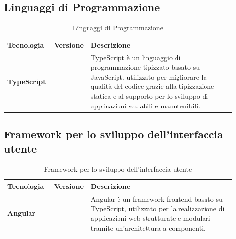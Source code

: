 \documentclass[a4paper,12pt]{article}
\begin{document}
{        \subsection{Linguaggi di Programmazione}
        \begin{table}[H]
            \captionsetup{skip=10pt}
            \caption{Linguaggi di Programmazione}
            \begin{tabular}{|>{\centering\arraybackslash}m{0.20\linewidth}|>{\centering\arraybackslash}m{0.10\linewidth}|>{\centering\arraybackslash}m{0.62\linewidth}|}
                \hline
                \textbf{Tecnologia} & \textbf{Versione} & \textbf{Descrizione} \\
                \hline
                \textbf{TypeScript} &  & TypeScript è un linguaggio di programmazione tipizzato basato su JavaScript, utilizzato per migliorare la qualità del codice grazie alla tipizzazione statica e al supporto per lo sviluppo di applicazioni scalabili e manutenibili. \\
                \hline
            \end{tabular}
        \end{table}

        \subsection{Framework per lo sviluppo dell'interfaccia utente}
        \begin{table}[H]
            \captionsetup{skip=10pt}
            \caption{Framework per lo sviluppo dell'interfaccia utente}
            \begin{tabular}{|>{\centering\arraybackslash}m{0.20\linewidth}|>{\centering\arraybackslash}m{0.10\linewidth}|>{\centering\arraybackslash}m{0.62\linewidth}|}
                \hline
                \textbf{Tecnologia} & \textbf{Versione} & \textbf{Descrizione} \\
                \hline
                \textbf{Angular} &  & Angular è un framework frontend basato su TypeScript, utilizzato per la realizzazione di applicazioni web strutturate e modulari tramite un’architettura a componenti. \\
                \hline
            \end{tabular}
        \end{table}

}
\end{document}
